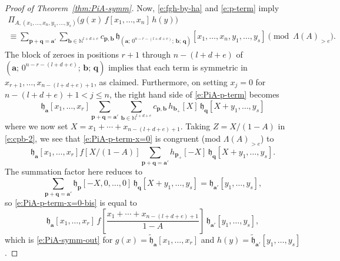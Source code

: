 \documentclass[12pt]{amsart}
\theoremstyle{definition}
\theoremstyle{remark}
\newcommand{\NN}{{\mathbb N}}
\newcommand{\aA}{{\mathbf a}}
\newcommand{\bb}{{\mathbf b}}
\newcommand{\pp}{{\mathbf p}}
\newcommand{\qq}{{\mathbf q}}
\newcommand{\fh}{{\mathfrak h}}
\newcommand{\tfh}{{\widetilde{\mathfrak h}}}
\begin{document}
\begin{proof}[Proof of Theorem~\ref{thm:PiA-symm}]
Now, \eqref{e:fgh-by-ha} and \eqref{e:p-term} imply
\begin{multline}\label{e:PiA-p-term}
\Pi _{A,(x_{1},\ldots,x_{n},y_{1},\ldots,y_{s})}
\bigl( g(x)\, f[x_{1},\ldots,x_{n}]\, h(y) \bigr)\\
\equiv \sum _{\pp +\qq =\aA '}\sum _{\bb \in \NN ^{l+d+e}} c_{\pp ,\bb
}\, \fh_{(\aA ;\, 0^{n-r-(l+d+e)};\, \bb ;\, \qq )} [x_{1}, \ldots,
x_{n}, y_{1}, \ldots, y_{s}] \pmod{\Lambda (A)_{>e}}.
\end{multline}
The block of zeroes in positions $r+1$ through $n-(l+d+e)$ of $(\aA
;\, 0^{n-r-(l+d+e)};\, \bb ;\, \qq )$ implies that each term is
symmetric in $x_{r+1},\ldots,x_{n-(l+d+e)+1}$, as claimed.
Furthermore, on setting $x_{j} = 0$ for $n-(l+d+e)+1 < j \leq n$, the
right hand side of \eqref{e:PiA-p-term} becomes
\begin{equation}\label{e:PiA-p-term-x=0}
\fh_{\aA }[x_{1},\ldots,x_{r}] \sum _{\pp +\qq =\aA '}\sum _{\bb \in \NN
^{l+d+e}} c_{\pp ,\bb }\, h_{\bb_+}[X]\, \fh_{\qq } [X + y_{1}, \ldots,
y_{s}]
\end{equation}
where we now set $X = x_{1}+\cdots +x_{n-(l+d+e)+1}$.  Taking $Z =
X/(1-A)$ in \eqref{e:cpb-2}, we see that \eqref{e:PiA-p-term-x=0} is
congruent (mod $\Lambda (A)_{>e}$) to
\begin{equation}\label{e:PiA-p-term-x=0-bis}
\fh_{\aA }[x_{1},\ldots,x_{r}] f[X/(1-A)] \sum _{\pp +\qq =\aA '} h_{\pp
_{+}}[-X]\, \fh_{\qq } [X + y_{1}, \ldots, y_{s}].
\end{equation}
The summation factor here reduces to
\begin{equation}\label{e:PiA-p-term-x=0-ter}
 \sum _{\pp +\qq =\aA '} \fh_{\pp }[-X,0,\ldots,0]\, \fh _{\qq } [X +
y_{1}, \ldots, y_{s}] = \fh_{\aA '}[y_{1},\ldots,y_{s}],
\end{equation}
so \eqref{e:PiA-p-term-x=0-bis} is equal to
\begin{equation}\label{e:PiA-p-term-x=0-iv}
\fh_{\aA }[x_{1},\ldots,x_{r}] \, f \! \left[\frac{x_{1}+\cdots
+x_{n-(l+d+e)+1}}{1-A} \right] \, \fh_{\aA '}[y_{1},\ldots,y_{s}],
\end{equation}
which is \eqref{e:PiA-symm-out} for $g(x) = \tfh_{\aA
}[x_{1},\ldots,x_{r}]$ and $h(y) = \tfh _{\aA
'}[y_{1},\ldots,y_{s}]$.
\end{proof}
\end{document}
